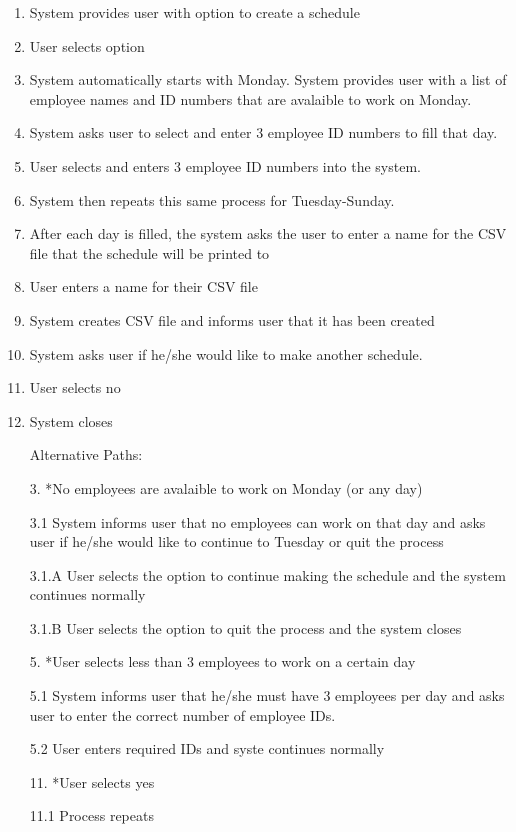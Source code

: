 \documentclass[12pt]{article}
\begin{document}
\begin{enumerate}


\item 
System provides user with option to create a schedule

\item
User selects option

\item
System automatically starts with Monday.  System provides user with a list of employee names and ID numbers that are avalaible to work on Monday.

\item
System asks user to select and enter 3 employee ID numbers to fill that day.

\item
User selects and enters 3 employee ID numbers into the system.

\item
System then repeats this same process for Tuesday-Sunday.

\item
After each day is filled, the system asks the user to enter a name for the CSV file that the schedule will be printed to

\item
User enters a name for their CSV file

\item
System creates CSV file and informs user that it has been created

\item
System asks user if he/she would like to make another schedule.

\item
User selects no

\item
System closes

Alternative Paths:

3. *No employees are avalaible to work on Monday (or any day)

3.1 System informs user that no employees can work on that day and asks user if he/she would like to continue to Tuesday or quit the process

3.1.A User selects the option to continue making the schedule and the system continues normally

3.1.B User selects the option to quit the process and the system closes

5. *User selects less than 3 employees to work on a certain day

5.1 System informs user that he/she must have 3 employees per day and asks user to enter the correct number of employee IDs.

5.2 User enters required IDs and syste continues normally

11. *User selects yes

11.1 Process repeats


\end{enumerate}
\end{document}
